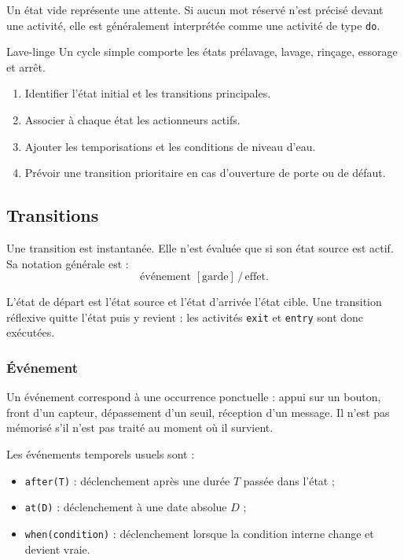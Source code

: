 \begin{center}\TLGrapheEtatDetaille\end{center}

Un état vide représente une attente. Si aucun mot réservé n'est précisé devant une activité, elle est généralement interprétée comme une activité de type \texttt{do}.

\begin{TLLogicApplication}{Lave-linge}
Un cycle simple comporte les états prélavage, lavage, rinçage, essorage et arrêt.
\begin{enumerate}
  \item Identifier l'état initial et les transitions principales.
  \item Associer à chaque état les actionneurs actifs.
  \item Ajouter les temporisations et les conditions de niveau d'eau.
  \item Prévoir une transition prioritaire en cas d'ouverture de porte ou de défaut.
\end{enumerate}
\end{TLLogicApplication}

\subsection{Transitions}

Une transition est instantanée. Elle n'est évaluée que si son état source est actif. Sa notation générale est :
\[
\boxed{\text{événement }[\text{garde}]\,/\,\text{effet}.}
\]

L'état de départ est l'état source et l'état d'arrivée l'état cible. Une transition réflexive quitte l'état puis y revient : les activités \texttt{exit} et \texttt{entry} sont donc exécutées.

\subsubsection{Événement}

Un événement correspond à une occurrence ponctuelle : appui sur un bouton, front d'un capteur, dépassement d'un seuil, réception d'un message. Il n'est pas mémorisé s'il n'est pas traité au moment où il survient.

Les événements temporels usuels sont :
\begin{itemize}
  \item \texttt{after(T)} : déclenchement après une durée $T$ passée dans l'état ;
  \item \texttt{at(D)} : déclenchement à une date absolue $D$ ;
  \item \texttt{when(condition)} : déclenchement lorsque la condition interne change et devient vraie.
\end{itemize}

